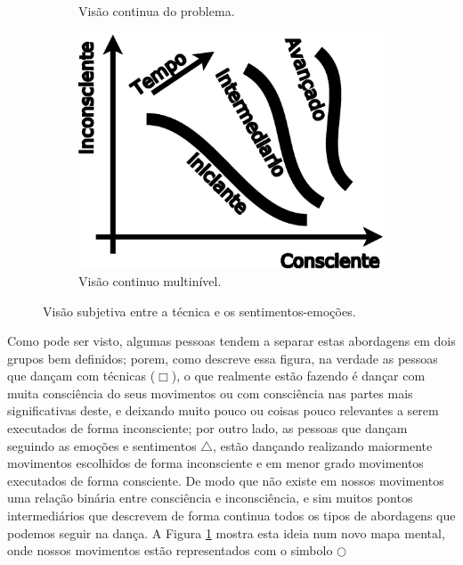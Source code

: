 \begin{figure}[ht]
\begin{subfigure}{.32\textwidth}
      \caption{Visão continua do problema.}
      \label{fig:tecniva-sentimento:b}
    \end{subfigure}
    \hfill
    \begin{subfigure}{.32\textwidth}
      \centering
      \includegraphics[width=.975\linewidth]{chapters/cap-musicalidade-tecnica/tecnica-emotion-3}  
      \caption{Visão continuo multinível.}
      \label{fig:tecniva-sentimento:c}
    \end{subfigure}
    \caption{Visão subjetiva entre a técnica e os sentimentos-emoções.}
    \label{fig:tecniva-sentimento}
\end{figure}
Como pode ser visto, algumas pessoas tendem a separar estas abordagens em dois grupos bem definidos;
porem, como descreve essa figura, na verdade as pessoas que dançam com técnicas ($\Box$),
o que realmente estão fazendo é dançar com muita consciência do seus movimentos
ou com consciência nas partes mais significativas deste,
e deixando muito pouco ou coisas pouco relevantes a serem executados de forma inconsciente;
por outro lado, as pessoas que dançam seguindo as emoções e sentimentos $\bigtriangleup$,
estão dançando realizando maiormente movimentos escolhidos de forma inconsciente 
e em menor grado movimentos executados de forma consciente.
De modo que não existe em nossos movimentos uma relação binária entre consciência e inconsciência,
e sim muitos pontos intermediários que descrevem de forma continua
todos os tipos de abordagens que podemos seguir na dança.
A Figura \ref{fig:tecniva-sentimento:b} mostra esta ideia num novo mapa mental,
onde nossos movimentos estão representados com o simbolo $\bigcirc$
